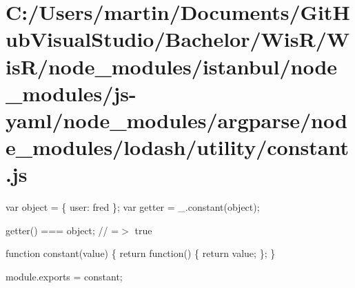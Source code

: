 \hypertarget{_c_1_2_users_2martin_2_documents_2_git_hub_visual_studio_2_bachelor_2_wis_r_2_wis_r_2node_module5be4bf39274b197f3683583b482280e0}{}\section{C\+:/\+Users/martin/\+Documents/\+Git\+Hub\+Visual\+Studio/\+Bachelor/\+Wis\+R/\+Wis\+R/node\+\_\+modules/istanbul/node\+\_\+modules/js-\/yaml/node\+\_\+modules/argparse/node\+\_\+modules/lodash/utility/constant.\+js}
var object = \{ \textquotesingle{}user\textquotesingle{}\+: \textquotesingle{}fred\textquotesingle{} \}; var getter = \+\_\+.\+constant(object);

getter() === object; // =$>$ true


\begin{DoxyCodeInclude}

\textcolor{keyword}{function} constant(value) \{
  \textcolor{keywordflow}{return} \textcolor{keyword}{function}() \{
    \textcolor{keywordflow}{return} value;
  \};
\}

module.exports = constant;
\end{DoxyCodeInclude}
 
